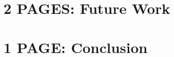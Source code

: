 \documentclass{seal_thesis}
\begin{document}
\chapter{2 PAGES: Future Work}



\chapter{1 PAGE: Conclusion}





\end{document}

